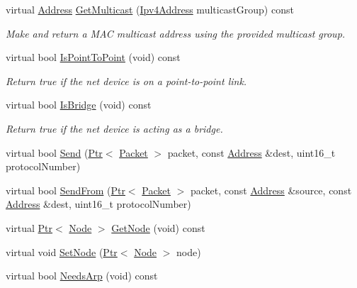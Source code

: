\begin{DoxyCompactItemize}
\item 
virtual \hyperlink{classns3_1_1Address}{Address} \hyperlink{classns3_1_1LoopbackNetDevice_acdc5982949f02ac8e98c6859b3fed58a}{Get\+Multicast} (\hyperlink{classns3_1_1Ipv4Address}{Ipv4\+Address} multicast\+Group) const 
\begin{DoxyCompactList}\small\item\em Make and return a M\+AC multicast address using the provided multicast group. \end{DoxyCompactList}\item 
virtual bool \hyperlink{classns3_1_1LoopbackNetDevice_ae8649da600c4a937db48e259965e448d}{Is\+Point\+To\+Point} (void) const 
\begin{DoxyCompactList}\small\item\em Return true if the net device is on a point-\/to-\/point link. \end{DoxyCompactList}\item 
virtual bool \hyperlink{classns3_1_1LoopbackNetDevice_acd2007b4b31b0bb284ecca76df83dfe4}{Is\+Bridge} (void) const 
\begin{DoxyCompactList}\small\item\em Return true if the net device is acting as a bridge. \end{DoxyCompactList}\item 
virtual bool \hyperlink{classns3_1_1LoopbackNetDevice_add41fe2884d42456ea019337bfa88c37}{Send} (\hyperlink{classns3_1_1Ptr}{Ptr}$<$ \hyperlink{classns3_1_1Packet}{Packet} $>$ packet, const \hyperlink{classns3_1_1Address}{Address} \&dest, uint16\+\_\+t protocol\+Number)
\item 
virtual bool \hyperlink{classns3_1_1LoopbackNetDevice_a95f0043ce01d85a65cf08cb6495886e0}{Send\+From} (\hyperlink{classns3_1_1Ptr}{Ptr}$<$ \hyperlink{classns3_1_1Packet}{Packet} $>$ packet, const \hyperlink{classns3_1_1Address}{Address} \&source, const \hyperlink{classns3_1_1Address}{Address} \&dest, uint16\+\_\+t protocol\+Number)
\item 
virtual \hyperlink{classns3_1_1Ptr}{Ptr}$<$ \hyperlink{classns3_1_1Node}{Node} $>$ \hyperlink{classns3_1_1LoopbackNetDevice_a95df57dcc2755a4b29af1925ed0f9c5b}{Get\+Node} (void) const 
\item 
virtual void \hyperlink{classns3_1_1LoopbackNetDevice_aee8ac2bb101b3489a1f3dd1682bdf3c2}{Set\+Node} (\hyperlink{classns3_1_1Ptr}{Ptr}$<$ \hyperlink{classns3_1_1Node}{Node} $>$ node)
\item 
virtual bool \hyperlink{classns3_1_1LoopbackNetDevice_af7c8b1f612bb78aed183080ab1e65cae}{Needs\+Arp} (void) const 

\end{DoxyCompactItemize}
